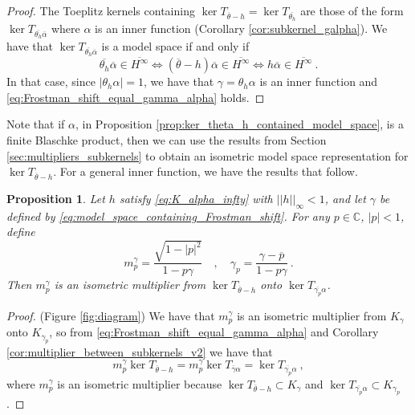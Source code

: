 \documentclass{article}
\numberwithin{equation}{section}
\theoremstyle{plain}
\newtheorem{prop}[thm]{Proposition}
\newcommand{\Hinf}{\ensuremath{H^\infty}}
\newcommand{\CC}{\ensuremath{\mathbb{C}}}
\newcommand{\ol}[1]{\ensuremath{\overline{#1}}}
\begin{document}
\begin{proof}
The Toeplitz kernels containing $\ker T_{\ol\theta - h} = \ker T_{\ol{\theta_h}}$ are those of the form $\ker T_{\ol{\theta_h}\ol\alpha}$ where $\alpha$ is an inner function (Corollary \ref{cor:subkernel_galpha}).
We have that $\ker T_{\ol{\theta_h}\ol\alpha}$ is a model space if and only if
\begin{equation}
\ol{\theta_h}\ol\alpha \in\ol\Hinf \iff (\ol\theta - h) \ol\alpha \in\ol\Hinf \iff h\ol\alpha \in\ol\Hinf \ .
\end{equation}
In that case, since $|\theta_h \alpha|=1$, we have that $\gamma = \theta_h \alpha$ is an inner function and \eqref{eq:Frostman_shift_equal_gamma_alpha} holds.
\end{proof}


Note that if $\alpha$, in Proposition \ref{prop:ker_theta_h_contained_model_space}, is a finite Blaschke product, then we can use the results from Section \ref{sec:multipliers_subkernels} to obtain an isometric model space representation for $\ker T_{\ol\theta -h}$.
For a general inner function, we have the results that follow.


\begin{prop}
\label{prop:isometric_multiplier_Frostman_shift}
Let $h$ satisfy \eqref{eq:K_alpha_infty} with $||h||_\infty < 1$, and let $\gamma$ be defined by \eqref{eq:model_space_containing_Frostman_shift}.
For any $p\in\CC$, $|p|<1$, define
\begin{equation}
m_p^\gamma = \frac{\sqrt{1-|p|^2}}{1-p\gamma}
\quad , \quad
\gamma_p = \frac{\gamma - \ol p}{1 - p\gamma}\ .
\end{equation}
Then $m_p^\gamma$ is an isometric multiplier from $\ker T_{\ol\theta -h}$ onto $\ker T_{\ol{\gamma_p} \alpha}$.
\end{prop}


\begin{proof}
(Figure \ref{fig:diagram})
We have that $m_p^\gamma$ is an isometric multiplier from $K_\gamma$ onto $K_{\gamma_p}$, so from \eqref{eq:Frostman_shift_equal_gamma_alpha} and Corollary \ref{cor:multiplier_between_subkernels_v2} we have that
\begin{equation}
m_p^\gamma \ker T_{\ol\theta -h} = m_p^\gamma \ker T_{\ol\gamma \alpha} = \ker T_{\ol{\gamma_p} \alpha}\ ,
\end{equation}
where $m_p^\gamma$ is an isometric multiplier because $\ker T_{\ol\theta -h} \subset K_\gamma$ and $\ker T_{\ol{\gamma_p} \alpha} \subset K_{\gamma_p}$.
\end{proof}
\end{document}
